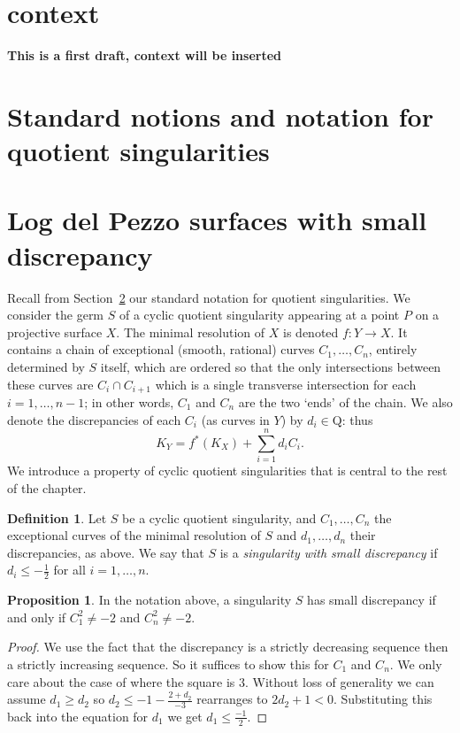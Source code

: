 \documentclass[11pt]{amsbook}
\theoremstyle{definition}
\theoremstyle{definition}
\theoremstyle{definition}
\newtheorem{prop}[thm]{Proposition}
\theoremstyle{definition}
\newtheorem{dfn}[thm]{Definition}
\theoremstyle{definition}
\theoremstyle{definition}
\theoremstyle{definition}
\theoremstyle{definition}
\newcommand{\Q}{\mathrm{Q}}
\begin{document}
 

\setcounter{chapter}{2}

\section{context}

\textbf{This is a first draft, context will be inserted}

\section{Standard notions and notation for quotient singularities}
\label{sec!notation}

\section{Log del Pezzo surfaces with small discrepancy}

Recall from Section~\ref{sec!notation} our standard notation for quotient singularities.
We consider the germ $S$ of a cyclic quotient singularity appearing at a point $P$ on a 
projective surface $X$.
The minimal resolution of $X$ is denoted $f\colon Y \longrightarrow X$. It contains a chain of
exceptional (smooth, rational)
curves $C_1,\dots,C_n$, entirely determined by $S$ itself, which are ordered so
that the only intersections between these curves are
$C_i\cap C_{i+1}$ which is a single transverse intersection for each $i=1,\dots,n-1$; 
in other words,
$C_1$ and $C_n$ are the two `ends' of the chain.
We also denote the discrepancies of each $C_i$ (as curves in $Y$) by $d_i\in\Q$: thus
\[
K_Y = f^*(K_X) + \sum_{i=1}^n d_i C_i.
\]
We introduce a property of cyclic quotient singularities that is central to the rest of the chapter.
\begin{dfn}
Let $S$ be a cyclic quotient singularity, and $C_1, \dots ,C_n$ the exceptional curves of the minimal resolution of $S$ and $d_1, \dots,d_n$ their discrepancies, as above.
We say that $S$ is a \emph{ singularity with small discrepancy} if $d_i \leq -\frac{1}{2}$ for
all $i=1,\dots,n$.
\end{dfn}

\begin{prop}
In the notation above,
a singularity $S$ has small discrepancy if and only if $C_1^2 \neq -2$ and $C_n^2 \neq -2$.
\end{prop}
\begin{proof}
 We use the fact that the discrepancy is a strictly decreasing sequence then a strictly increasing sequence. So it suffices to show this for $C_1$ and $C_n$. We only care about the case of where the square is $3$. Without loss of generality we can assume $d_1 \geq d_2$ so $ d_2 \leq -1 - \frac{2 + d_2}{-3}$ rearranges to $2d_2 + 1 < 0$. Substituting this back into the equation for $d_1$ we get $d_1 \leq  \frac{-1}{2}$. 
 \end{proof}
\end{document}

